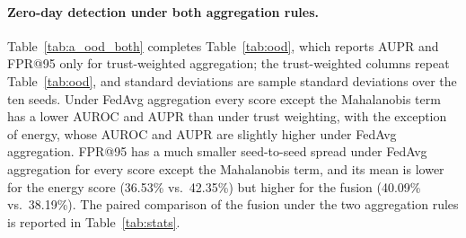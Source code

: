 \documentclass[pdflatex,sn-mathphys-num]{sn-jnl}
\newcommand{\Rtwo}{\color{blue}}
\begin{document}
{{{{{\paragraph{Zero-day detection under both aggregation rules.} Table~\ref{tab:a_ood_both} completes Table~\ref{tab:ood}, which reports AUPR and FPR@95 only for trust-weighted aggregation; the trust-weighted columns repeat Table~\ref{tab:ood}, and standard deviations are {\Rtwo sample standard deviations} over the ten seeds. Under FedAvg aggregation every score except the Mahalanobis term has a lower AUROC and AUPR than under trust weighting, with the exception of energy, whose AUROC and AUPR are slightly higher under FedAvg aggregation. FPR@95 has a much smaller seed-to-seed spread under FedAvg aggregation for every score except the Mahalanobis term, and its mean is lower for the energy score (36.53\% vs.\ 42.35\%) but higher for the fusion (40.09\% vs.\ 38.19\%). The paired comparison of the fusion under the two aggregation rules is reported in Table~\ref{tab:stats}.

\begin{table}[!htbp]\centering
\caption{Zero-day detection on TON-IoT under trust-weighted and FedAvg aggregation (mean $\pm$ std over ten seeds).}\label{tab:a_ood_both}
\scriptsize
\setlength{\tabcolsep}{3pt}
\end{table}

}}}}}
\end{document}
